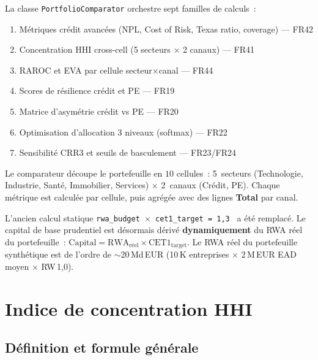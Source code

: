 \documentclass[12pt,a4paper]{article}
\begin{document}
La classe \texttt{PortfolioComparator} orchestre sept familles de calculs~:

\begin{enumerate}[nosep]
    \item M\'etriques cr\'edit avanc\'ees (NPL, Cost of Risk, Texas ratio, coverage) --- FR42
    \item Concentration HHI cross-cell (5 secteurs $\times$ 2 canaux) --- FR41
    \item RAROC et EVA par cellule secteur$\times$canal --- FR44
    \item Scores de r\'esilience cr\'edit et PE --- FR19
    \item Matrice d'asym\'etrie cr\'edit vs PE --- FR20
    \item Optimisation d'allocation 3 niveaux (softmax) --- FR22
    \item Sensibilit\'e CRR3 et seuils de basculement --- FR23/FR24
\end{enumerate}

\begin{definitionbox}
Le comparateur d\'ecoupe le portefeuille en $10$ cellules~: 5~secteurs (Technologie, Industrie, Sant\'e, Immobilier, Services) $\times$ 2~canaux (Cr\'edit, PE). Chaque m\'etrique est calcul\'ee par cellule, puis agr\'eg\'ee avec des lignes \textbf{Total} par canal.
\end{definitionbox}

\begin{warningbox}
L'ancien calcul statique \texttt{rwa\_budget $\times$ cet1\_target = 1{,}3\,} a \'et\'e remplac\'e. Le capital de base prudentiel est d\'esormais d\'eriv\'e \textbf{dynamiquement} du RWA r\'eel du portefeuille~: $\text{Capital} = \text{RWA}_{\text{r\'eel}} \times \text{CET1}_{\text{target}}$. Le RWA r\'eel du portefeuille synth\'etique est de l'ordre de $\sim$20\,Md\,EUR (10\,K entreprises $\times$ 2\,M\,EUR EAD moyen $\times$ RW\,1{,}0).
\end{warningbox}

\section{Indice de concentration HHI}
\label{sec:hhi}

\subsection{D\'efinition et formule g\'en\'erale}
\end{document}
